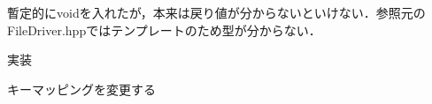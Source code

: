 
\begin{DoxyRefList}
\item[Class \mbox{\hyperlink{classfileIO_1_1FileIO}{file\+IO\+::File\+IO}} ]\label{todo__todo000001}%
%
暫定的にvoidを入れたが，本来は戻り値が分からないといけない．参照元の\+File\+Driver.\+hppではテンプレートのため型が分からない．  
\item[Class \mbox{\hyperlink{classinputHandler_1_1CommandInput}{input\+Handler\+::Command\+Input}} ]\label{todo__todo000002}%
%
実装  
\item[Member \mbox{\hyperlink{classUI_1_1NcursesUI_a747800e9d9fc788a5c879a410a0d6f03}{UI\+::Ncurses\+UI\+::Get\+Input}} () -\/$>$ \mbox{\hyperlink{namespacetextEditor_ade3de5dab8e0c8cbcfb9bf305a51af4e}{text\+Editor\+::\+Key}} override]\label{todo__todo000003}%
%
キーマッピングを変更する 
\end{DoxyRefList}